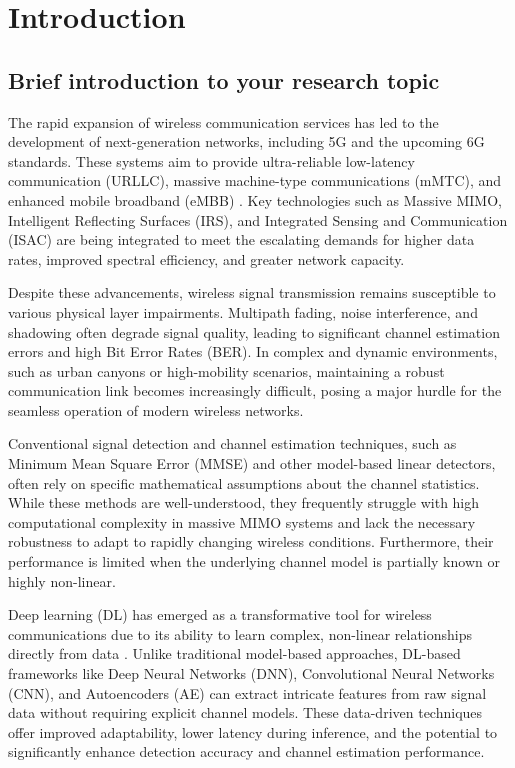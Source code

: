 \documentclass[10pt, conference]{IEEEtran}
\begin{document}
\section{Introduction}
\subsection{Brief introduction to your research topic} 

The rapid expansion of wireless communication services has led to the development of next-generation networks, including 5G and the upcoming 6G standards. These systems aim to provide ultra-reliable low-latency communication (URLLC), massive machine-type communications (mMTC), and enhanced mobile broadband (eMBB) \cite{liu2023}. Key technologies such as Massive MIMO, Intelligent Reflecting Surfaces (IRS), and Integrated Sensing and Communication (ISAC) \cite{liu2022} are being integrated to meet the escalating demands for higher data rates, improved spectral efficiency, and greater network capacity.

Despite these advancements, wireless signal transmission remains susceptible to various physical layer impairments. Multipath fading, noise interference, and shadowing often degrade signal quality, leading to significant channel estimation errors and high Bit Error Rates (BER). In complex and dynamic environments, such as urban canyons or high-mobility scenarios, maintaining a robust communication link becomes increasingly difficult, posing a major hurdle for the seamless operation of modern wireless networks.

Conventional signal detection and channel estimation techniques, such as Minimum Mean Square Error (MMSE) and other model-based linear detectors, often rely on specific mathematical assumptions about the channel statistics. While these methods are well-understood, they frequently struggle with high computational complexity in massive MIMO systems and lack the necessary robustness to adapt to rapidly changing wireless conditions. Furthermore, their performance is limited when the underlying channel model is partially known or highly non-linear.

Deep learning (DL) has emerged as a transformative tool for wireless communications due to its ability to learn complex, non-linear relationships directly from data \cite{gunduz2019}. Unlike traditional model-based approaches, DL-based frameworks like Deep Neural Networks (DNN), Convolutional Neural Networks (CNN), and Autoencoders (AE) can extract intricate features from raw signal data without requiring explicit channel models. These data-driven techniques offer improved adaptability, lower latency during inference, and the potential to significantly enhance detection accuracy and channel estimation performance.
\end{document}
